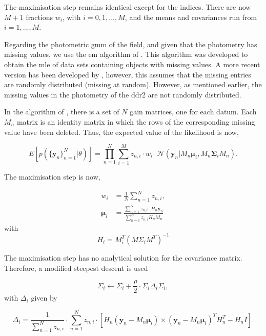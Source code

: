 The maximisation step remains identical except for the indices. There are now $M+1$ fractions $w_i$, with $i=0,1,...,M$, and the means and covariances run from $i=1,...,M$.

Regarding the photometric \gls{gmm} of the field, and given that the photometry has missing values, we use the \gls{em} algorithm of \citet{McMichael1996}. This algorithm was developed to obtain the \gls{mle} of data sets containing objects with missing values. A more recent version has been developed by \citet{Lin2006}, however, this assumes that the missing entries are randomly distributed (missing at random). However,  as mentioned earlier, the missing values in the photometry of the \gls{ddr2} are not randomly distributed.

In the algorithm of \citet{McMichael1996}, there is a set of $N$ gain matrices, one for each datum. Each $M_n$ matrix is an identity matrix in which the rows of the corresponding missing value have been deleted. Thus, the expected value of the likelihood is now,

\begin{equation}
E[p(\{\mathbf{y}_n\}_{n=1}^N|\theta)]=\prod_{n=1}^N {\sum_{i=1} ^M {z_{n,i}\cdot w_i\cdot \mathcal{N}(\mathbf{y}_n|M_n \boldsymbol{\mu}_i,M_n\boldsymbol{\Sigma}_i M_n)}}.
\end{equation}

The maximisation step is now,

\begin{align}
w_i &= \frac{1}{N} \sum_{n=1}^N z_{n,i}, \\
\boldsymbol{\mu}_i &= \frac{ \sum_{n=1}^N z_{n,i}\cdot H_n \mathbf{y}_n}{\sum_{n=1}^N z_{n,i} H_n M_n}
\end{align}
with 
\begin{equation}
H_i=M_i^T(M\Sigma_i M^T)^{-1}
\end{equation}

The maximisation step has no analytical solution for the covariance matrix. Therefore, a modified steepest descent is used

\begin{equation}
\Sigma_i \leftarrow \Sigma_i + \frac{\rho}{2}\cdot \Sigma_i\Delta_i\Sigma_i,
\end{equation}
with $\Delta_i$ given by

\begin{equation}
\Delta_i=  \frac{1}{\sum_{n=1}^N z_{n,i}}\cdot \sum_{n=1}^N z_{n,i} \cdot \left[H_n(\mathbf{y}_n -  M_n \boldsymbol{\mu}_i) \times  (\mathbf{y}_n -  M_n \boldsymbol{\mu}_i)^TH_n^T - H_nI\right].
\end{equation}
 
